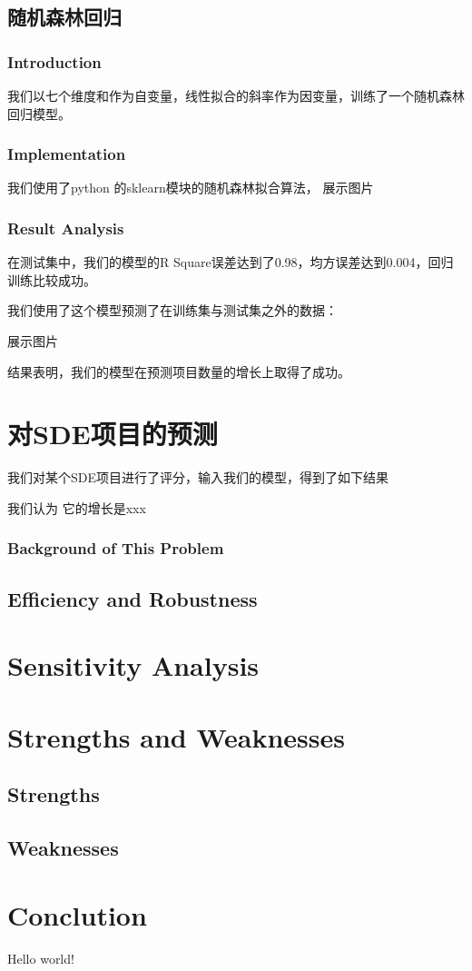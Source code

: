 \documentclass[a4paper]{article}
\begin{document}
\subsection{随机森林回归}
\subsubsection{Introduction}

我们以七个维度和作为自变量，线性拟合的斜率作为因变量，训练了一个随机森林回归模型。

\subsubsection{Implementation}
我们使用了python 的sklearn模块的随机森林拟合算法，
展示图片


\subsubsection{Result Analysis}
在测试集中，我们的模型的R Square误差达到了0.98，均方误差达到0.004，回归训练比较成功。

我们使用了这个模型预测了在训练集与测试集之外的数据：

展示图片

结果表明，我们的模型在预测项目数量的增长上取得了成功。



\section{对SDE项目的预测}
我们对某个SDE项目进行了评分，输入我们的模型，得到了如下结果

我们认为 它的增长是xxx
\subsubsection{Background of This Problem}
\subsection{Efficiency and Robustness}
\section{Sensitivity Analysis}
\section{Strengths and Weaknesses}
\subsection{Strengths}
\subsection{Weaknesses}
\section{Conclution}
Hello world!
\end{document}
